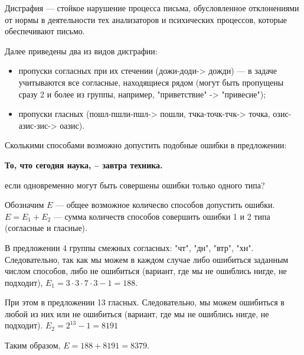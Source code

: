 
Дисграфия — стойкое нарушение процесса письма, обусловленное отклонениями от нормы в деятельности тех анализаторов и психических процессов, которые обеспечивают письмо. 

Далее приведены два из видов дисграфии:

\begin{itemize}
    \item пропуски согласных при их стечении (дожи-доди-> дожди) — в задаче учитываются все согласные, находящиеся рядом (могут быть пропущены сразу 2 и более из группы, например, "приветствие" -> "привесие");
    \item пропуски гласных (пошл-пшли-пшл-> пошли, тчка-точк-тчк-> точка, озис-азис-зис-> оазис).
\end{itemize}

Сколькими способами возможно допустить подобные ошибки в предложении:

\begin{center}
    \textbf{То, что сегодня наука, – завтра техника.}
\end{center}

если одновременно могут быть совершены ошибки только одного типа?

\solutionSection

Обозначим $E$ — общее возможное количесво способов допустить ошибки.
$E = E_1 + E_2$ — сумма количеств способов совершить ошибки 1 и 2 типа (согласные и гласные).

В предложении 4 группы смежных согласных: "чт", "дн", "втр", "хн". Следовательно, так как мы можем в каждом случае либо ошибиться заданным числом способов, либо не ошибиться (вариант, где мы не ошиблись нигде, не подходит), $E_1 = 3\cdot 3\cdot 7 \cdot 3 - 1 = 188$.

При этом в предложении 13 гласных. Следовательно, мы можем ошибиться в любой из них или не ошибиться (вариант, где мы не ошиблись нигде, не подходит). $E_2 = 2^{13} - 1 = 8191$

Таким образом, $E = 188 + 8191 = 8379$.

